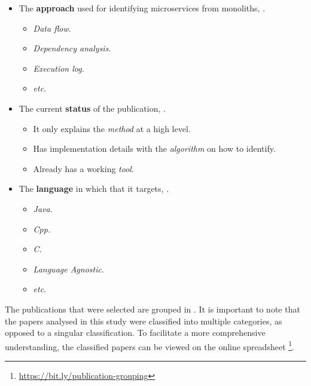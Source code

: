 \documentclass[conference]{IEEEtran}
\begin{document}
\begin{itemize}
  \item The \textbf{approach} used for identifying microservices from
    monoliths, .
  \begin{itemize}
    \item \textit{Data flow}.
    \item \textit{Dependency analysis}.
    \item \textit{Execution log}.
    \item \textit{etc}.
  \end{itemize}
  \item The current \textbf{status} of the publication,
    .
  \begin{itemize}
    \item It only explains the \textit{method} at a high level.
    \item Has implementation details with the \textit{algorithm} on how to
      identify.
    \item Already has a working \textit{tool}.
  \end{itemize}
  \item The \textbf{language} in which that it targets,
    .
  \begin{itemize}
    \item \textit{Java}.
    \item \textit{Cpp}.
    \item \textit{C}.
    \item \textit{Language Agnostic}.
    \item \textit{etc}.
  \end{itemize}
\end{itemize}

The publications that were selected are grouped in
. It is
important to note that the papers analysed in this study were classified into
multiple categories, as opposed to a singular classification. To facilitate a
more comprehensive understanding, the classified papers can be viewed on the
online spreadsheet \footnote{\url{https://bit.ly/publication-grouping}}.
\end{document}
